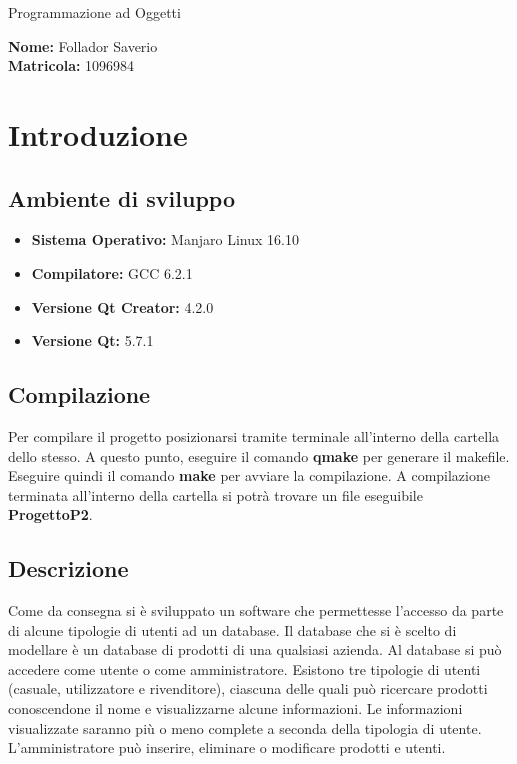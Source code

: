 \documentclass[a4paper,10pt] {article}
\begin{document}
\begin{center}

\begin{Huge} Programmazione ad Oggetti \end{Huge}

\vfill

\begin{Large} \textbf{Nome:} Follador Saverio \\ \textbf{Matricola:} 1096984 \end{Large}

\end{center}

\newpage

\tableofcontents

\newpage

\section{Introduzione}

\subsection{Ambiente di sviluppo}
\begin{itemize}
	\item \textbf{Sistema Operativo:} Manjaro Linux 16.10
	\item \textbf{Compilatore:} GCC 6.2.1
	\item \textbf{Versione Qt Creator:} 4.2.0
	\item \textbf{Versione Qt:} 5.7.1
\end{itemize}

\subsection{Compilazione}
Per compilare il progetto posizionarsi tramite terminale all'interno della cartella dello stesso. A questo punto, eseguire il comando \textbf{qmake} per generare
il makefile. Eseguire quindi il comando \textbf{make} per avviare la compilazione. A compilazione terminata all'interno della cartella si potrà trovare un file 
eseguibile \textbf{ProgettoP2}.

\subsection{Descrizione}
Come da consegna si è sviluppato un software che permettesse l'accesso da parte di alcune tipologie di utenti ad un database. Il database che si è scelto di 
modellare è un database di prodotti di una qualsiasi azienda. Al database si può accedere come utente o come amministratore. Esistono tre tipologie di utenti (casuale, utilizzatore e rivenditore), ciascuna delle quali può
ricercare prodotti conoscendone il nome e visualizzarne alcune informazioni. Le informazioni visualizzate saranno più o meno complete a seconda della tipologia
di utente. L'amministratore può inserire, eliminare o modificare prodotti e utenti.
\end{document}
